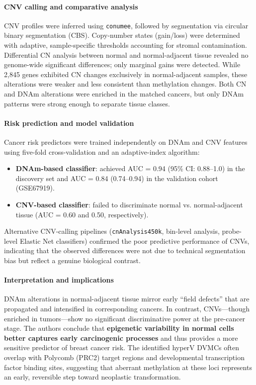 \documentclass[10pt]{extarticle}
\begin{document}
\paragraph{CNV calling and comparative analysis}
CNV profiles were inferred using \texttt{conumee}, followed by segmentation via circular binary segmentation (CBS). Copy-number states (gain/loss) were determined with adaptive, sample-specific thresholds accounting for stromal contamination.  
Differential CN analysis between normal and normal-adjacent tissue revealed no genome-wide significant differences; only marginal gains were detected. While 2,845 genes exhibited CN changes exclusively in normal-adjacent samples, these alterations were weaker and less consistent than methylation changes. Both CN and DNAm alterations were enriched in the matched cancers, but only DNAm patterns were strong enough to separate tissue classes.

\paragraph{Risk prediction and model validation}
Cancer risk predictors were trained independently on DNAm and CNV features using five-fold cross-validation and an adaptive-index algorithm:
\begin{itemize}[label=-]
\item \textbf{DNAm-based classifier}: achieved AUC = 0.94 (95\% CI: 0.88–1.0) in the discovery set and AUC = 0.84 (0.74–0.94) in the validation cohort (GSE67919).
\item \textbf{CNV-based classifier}: failed to discriminate normal vs. normal-adjacent tissue (AUC = 0.60 and 0.50, respectively).
\end{itemize}
Alternative CNV-calling pipelines (\texttt{cnAnalysis450k}, bin-level analysis, probe-level Elastic Net classifiers) confirmed the poor predictive performance of CNVs, indicating that the observed differences were not due to technical segmentation bias but reflect a genuine biological contrast.

\paragraph{Interpretation and implications}
DNAm alterations in normal-adjacent tissue mirror early “field defects” that are propagated and intensified in corresponding cancers. In contrast, CNVs—though enriched in tumors—show no significant discriminative power at the pre-cancer stage. The authors conclude that \textbf{epigenetic variability in normal cells better captures early carcinogenic processes} and thus provides a more sensitive predictor of breast cancer risk.  
The identified hyperV DVMCs often overlap with Polycomb (PRC2) target regions and developmental transcription factor binding sites, suggesting that aberrant methylation at these loci represents an early, reversible step toward neoplastic transformation.
\end{document}
